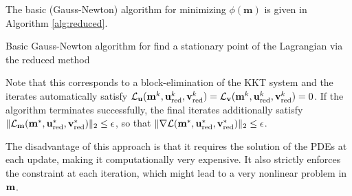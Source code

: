 \documentclass{iopart}
\begin{document}
The basic (Gauss-Newton) algorithm for minimizing $\phi(\mathbf{m})$ is given in 
Algorithm \ref{alg:reduced}.
\begin{algorithm}
\caption{Basic Gauss-Newton algorithm for find a stationary point of the Lagrangian via the reduced method}
\label{alg:reduced}
\begin{algorithmic}
\REPEAT
{}
\end{algorithmic}
\end{algorithm}
Note that this corresponds to a block-elimination of the KKT system and the iterates automatically
satisfy $\mathcal{L}_{\mathbf{u}}(\mathbf{m}^k,\mathbf{u}^k_{\mathrm{red}},\mathbf{v}^k_{\mathrm{red}}) = \mathcal{L}_{\mathbf{v}}(\mathbf{m}^k,\mathbf{u}^k_{\mathrm{red}},\mathbf{v}^k_{\mathrm{red}}) = 0$. 
If the algorithm terminates successfully, the final iterates additionally satisfy
$\|\mathcal{L}_{\mathbf{m}}(\mathbf{m}^*,\mathbf{u}^*_{\mathrm{red}},\mathbf{v}^*_{\mathrm{red}})\|_2 \leq \epsilon$, so that 
$\|\nabla\mathcal{L}(\mathbf{m}^*,\mathbf{u}^*_{\mathrm{red}},\mathbf{v}^*_{\mathrm{red}})\|_2\leq \epsilon$.

The disadvantage of this approach is that it
requires the solution of the PDEs at each update, making it computationally very expensive. 
It also strictly enforces the constraint at each iteration, which might lead to a very
nonlinear problem in $\mathbf{m}$. 
% 
\end{document}
